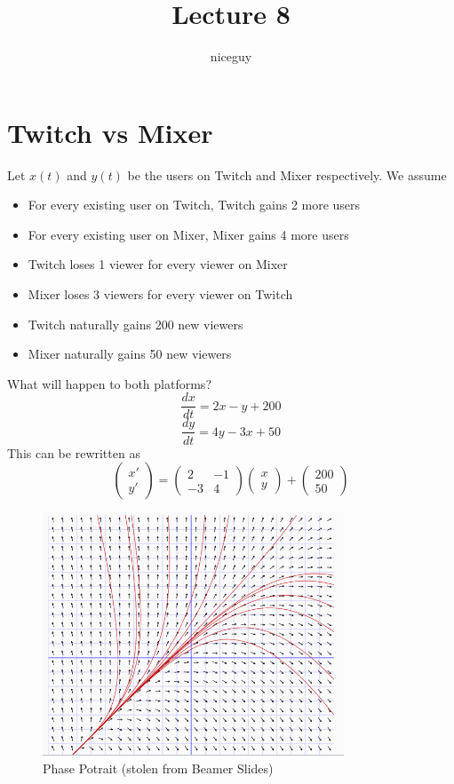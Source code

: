 \documentclass[12pt]{article}
\title{Lecture 8}
\author{niceguy}
\begin{document}
\maketitle

\section{Twitch vs Mixer}
Let $x(t)$ and $y(t)$ be the users on Twitch and Mixer respectively. We assume
\begin{itemize}
	\item For every existing user on Twitch, Twitch gains 2 more users
	\item For every existing user on Mixer, Mixer gains 4 more users
	\item Twitch loses 1 viewer for every viewer on Mixer
	\item Mixer loses 3 viewers for every viewer on Twitch
	\item Twitch naturally gains 200 new viewers
	\item Mixer naturally gains 50 new viewers
\end{itemize}

What will happen to both platforms?
$$\frac{dx}{dt} = 2x-y+200$$
$$\frac{dy}{dt} = 4y-3x+50$$
This can be rewritten as
$$\begin{pmatrix} x' \\ y' \end{pmatrix} = \begin{pmatrix} 2 & -1 \\ -3 & 4 \end{pmatrix} \begin{pmatrix} x \\ y \end{pmatrix} + \begin{pmatrix} 200 \\ 50 \end{pmatrix}$$

\begin{figure}
	\centering
	\includegraphics[width=\textwidth]{phasepotraita.png}
	\caption{Phase Potrait (stolen from Beamer Slides)}
	\label{pota}
\end{figure}
\end{document}
